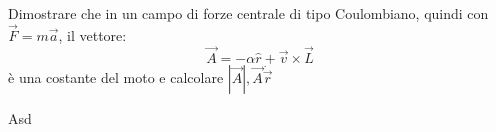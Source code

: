 \documentclass[../main.tex]{subfiles}
\begin{document}

\textex
Dimostrare che in un campo di forze centrale di tipo Coulombiano, quindi con $\vec{F}=m\vec{a}$, il vettore:
\begin{equation} \label{vl:Definizione}
	\vec{A}=-\alpha \hat r + \vec v\times \vec L
\end{equation}
è una costante del moto e calcolare $|\vec A|, \vec A\dot \vec r$


\solution
Asd
\end{document}
